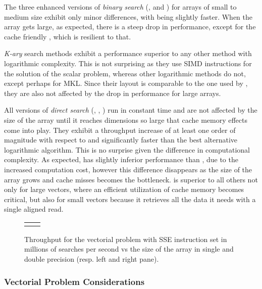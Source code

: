 \documentclass[preprint,1p,times]{elsarticle}
\begin{document}
The three enhanced versions of \textit{binary search} (\textit{\BitSetName}, \textit{\ClassicOffsetName} and \textit{\EytzingerName}) for arrays of small to medium size exhibit only minor differences, with \textit{\BitSetName} being slightly faster. When the array  gets large, as expected, there is a steep drop in performance, except for the cache friendly \textit{\EytzingerName}, which is resilient to that.

\textit{K-ary} search methods exhibit a performance superior to any other method with logarithmic complexity. This is not surprising as they use SIMD instructions for the solution of the scalar problem, whereas other logarithmic methods do not, except perhaps for MKL. Since their layout is comparable to the one used by \textit{\EytzingerName}, they are also not affected by the drop in performance for large arrays.

All versions of \textit{direct search} (\textit{\DirectName}, \textit{\DirectGapName}, \textit{\DirectCacheName}) run in constant time and are not affected by the size of the array  until it reaches dimensions so large that cache memory effects come into play. They exhibit a throughput increase of at least one order of magnitude with respect to \textit{\ClassicName} and significantly faster than the best alternative logarithmic algorithm. This is no surprise given the difference in computational complexity. As expected, \textit{\DirectGapName} has slightly inferior performance than \textit{\DirectName}, due to the increased computation cost, however this difference disappears as the size of the array grows and cache misses becomes the bottleneck. \textit{\DirectCacheName} is superior to all others not only for large vectors, where an efficient utilization of cache memory becomes critical, but also for small vectors because it retrieves all the data it needs with a single aligned read.

\begin{figure}\begin{tabular}{@{\hskip1pt}c@{\hskip1pt} @{\hskip1pt}c@{\hskip1pt}}
		\perfchart{SSE}{single} & \perfchart{SSE}{double}
	\end{tabular}
\vspace*{-4mm}
	\caption{Throughput for the vectorial problem with SSE instruction set in millions of searches per second vs the size of the array  in single and double precision (resp. left and right pane).}
	\label{fig:perf-SSE}\end{figure}


\subsubsection{Vectorial Problem Considerations}
\end{document}
